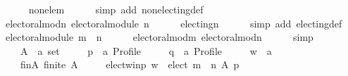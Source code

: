\begin{isabellebody}
\ \ \ \ \isamarkupfalse%
\ non{\isacharunderscore}{\kern0pt}ele{\isacharunderscore}{\kern0pt}m\isanewline
\ \ \ \ \isamarkupfalse%
\ {\isacharparenleft}{\kern0pt}simp\ add{\isacharcolon}{\kern0pt}\ non{\isacharunderscore}{\kern0pt}electing{\isacharunderscore}{\kern0pt}def{\isacharparenright}{\kern0pt}\isanewline
\ \ \isamarkupfalse%
\ electoral{\isacharunderscore}{\kern0pt}mod{\isacharunderscore}{\kern0pt}n{\isacharcolon}{\kern0pt}\ {\isachardoublequoteopen}electoral{\isacharunderscore}{\kern0pt}module\ n{\isachardoublequoteclose}\isanewline
\ \ \ \ \isamarkupfalse%
\ electing{\isacharunderscore}{\kern0pt}n\isanewline
\ \ \ \ \isamarkupfalse%
\ {\isacharparenleft}{\kern0pt}simp\ add{\isacharcolon}{\kern0pt}\ electing{\isacharunderscore}{\kern0pt}def{\isacharparenright}{\kern0pt}\isanewline
\ \ \isamarkupfalse%
\ {\isachardoublequoteopen}electoral{\isacharunderscore}{\kern0pt}module\ {\isacharparenleft}{\kern0pt}m\ {\isasymtriangleright}\ n{\isacharparenright}{\kern0pt}{\isachardoublequoteclose}\isanewline
\ \ \ \ \isamarkupfalse%
\ electoral{\isacharunderscore}{\kern0pt}mod{\isacharunderscore}{\kern0pt}m\ electoral{\isacharunderscore}{\kern0pt}mod{\isacharunderscore}{\kern0pt}n\isanewline
\ \ \ \ \isamarkupfalse%
\ simp\isanewline
{}\isamarkupfalse%
\isanewline
\ \ \isamarkupfalse%
\isanewline
\ \ \ \ A\ {\isacharcolon}{\kern0pt}{\isacharcolon}{\kern0pt}\ {\isachardoublequoteopen}{\isacharprime}{\kern0pt}a\ set{\isachardoublequoteclose}\ \isanewline
\ \ \ \ p\ {\isacharcolon}{\kern0pt}{\isacharcolon}{\kern0pt}\ {\isachardoublequoteopen}{\isacharprime}{\kern0pt}a\ Profile{\isachardoublequoteclose}\ \isanewline
\ \ \ \ q\ {\isacharcolon}{\kern0pt}{\isacharcolon}{\kern0pt}\ {\isachardoublequoteopen}{\isacharprime}{\kern0pt}a\ Profile{\isachardoublequoteclose}\ \isanewline
\ \ \ \ w\ {\isacharcolon}{\kern0pt}{\isacharcolon}{\kern0pt}\ {\isachardoublequoteopen}{\isacharprime}{\kern0pt}a{\isachardoublequoteclose}\isanewline
\ \ \isamarkupfalse%
\isanewline
\ \ \ \ fin{\isacharunderscore}{\kern0pt}A{\isacharcolon}{\kern0pt}\ {\isachardoublequoteopen}finite\ A{\isachardoublequoteclose}\ \isanewline
\ \ \ \ elect{\isacharunderscore}{\kern0pt}w{\isacharunderscore}{\kern0pt}in{\isacharunderscore}{\kern0pt}p{\isacharcolon}{\kern0pt}\ {\isachardoublequoteopen}w\ {\isasymin}\ elect\ {\isacharparenleft}{\kern0pt}m\ {\isasymtriangleright}\ n{\isacharparenright}{\kern0pt}\ A\ p{\isachardoublequoteclose}\ \isanewline

\end{isabellebody}
